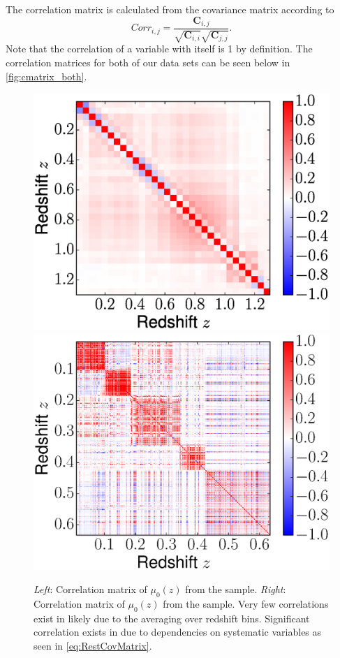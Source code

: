 \documentclass[12pt,a4paper]{article}
\begin{document}
The correlation matrix is calculated from the covariance matrix according to
%
\begin{equation}
  \label{eq:correlation}
  Corr_{i,j} = \frac{\mathbf{C}_{i,j}}{\sqrt{\mathbf{C}_{i,i}}\sqrt{\mathbf{C}_{j,j}}}.
\end{equation}
%
Note that the correlation of a variable with itself is 1 by definition.
The correlation matrices for both of our data sets can be seen below in
\autoref{fig:cmatrix_both}.
%
\begin{figure}
  \includegraphics[width=0.5\linewidth]{figures/Betoule_correlation.eps}
  \includegraphics[width=0.5\linewidth]{figures/Rest_correlation.eps}
  \caption{{\it Left}: Correlation matrix of $\mu_0(z)$ from the
    \citet{betoule2014} sample. {\it Right}: Correlation matrix of $\mu_0(z)$ from 
	the \citet{rest2014} sample. Very few correlations exist in 
        \citet{betoule2014} likely due to the averaging over redshift bins. 
	Significant correlation exists in \citet{rest2014} due to dependencies 
	on systematic variables as seen in \autoref{eq:RestCovMatrix}.}
  \label{fig:cmatrix_both}
\end{figure}
\end{document}

